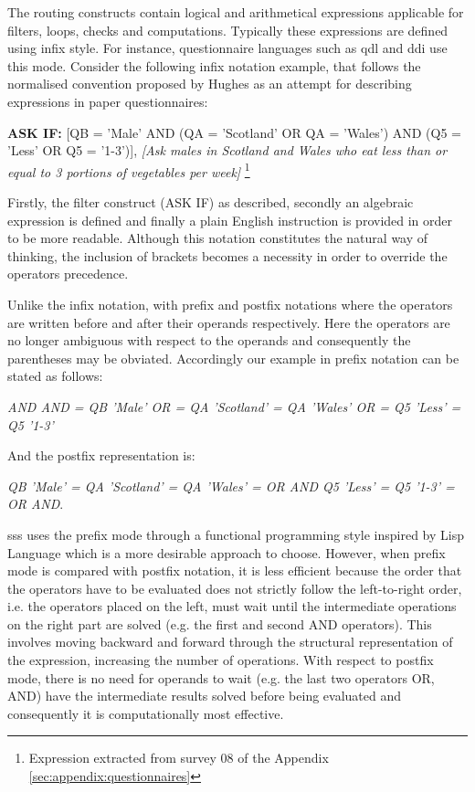 	The routing constructs contain logical and arithmetical expressions applicable for filters, loops, checks and computations. Typically these expressions are defined using infix style. For instance, questionnaire languages such as \gls{qdl} and \gls{ddi} use this mode. Consider the following infix notation example, that follows the normalised convention proposed by Hughes \cite{proc:Hughes07} as an attempt for describing expressions in paper questionnaires:

	\textbf{ASK IF:} [QB = 'Male' AND (QA = 'Scotland' OR QA = 'Wales') AND (Q5 = 'Less' OR Q5 = '1-3')], \emph{[Ask males in Scotland and Wales who eat less than or equal to 3 portions of vegetables per week]} \footnote{Expression extracted from survey 08 of the Appendix \ref{sec:appendix:questionnaires}}

	Firstly, the filter construct (ASK IF) as described, secondly an algebraic expression is defined and finally a plain English instruction is provided in order to be more readable. Although this notation constitutes the natural way of thinking, the inclusion of brackets becomes a necessity in order to override the operators precedence.

	Unlike the infix notation, with prefix and postfix notations where the operators are written before and after their operands respectively. Here the operators are no longer ambiguous with respect to the operands and consequently the parentheses may be obviated. Accordingly our example in prefix notation can be stated as follows:

	\emph{AND AND = QB 'Male' OR = QA 'Scotland' = QA 'Wales' OR = Q5 'Less' = Q5 '1-3'}

	And the postfix representation is:

	\emph{QB 'Male' = QA 'Scotland' = QA 'Wales' = OR AND Q5 'Less' = Q5 '1-3' = OR AND}.

	\gls{sss} uses the prefix mode through a functional programming style inspired by Lisp Language which is a more desirable approach to choose. However, when prefix mode is compared with postfix notation, it is less efficient because the order that the operators have to be evaluated does not strictly follow the left-to-right order, i.e. the operators placed on the left, must wait until the intermediate operations on the right part are solved (e.g. the first and second AND operators). This involves moving backward and forward through the structural representation of the expression, increasing the number of operations. With respect to postfix mode, there is no need for operands to wait (e.g. the last two operators OR, AND) have the intermediate results solved before being evaluated and consequently it is computationally most effective.